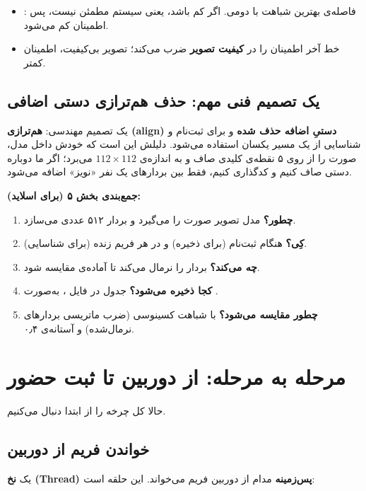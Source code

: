 \documentclass[12pt,a4paper]{article}
\begin{document}
\begin{itemize}[rightmargin=0pt]
  \item {}: فاصله‌ی بهترین شباهت با دومی. اگر کم باشد، یعنی سیستم مطمئن نیست، پس اطمینان کم می‌شود.
  \item خط آخر اطمینان را در \textbf{کیفیت تصویر} ضرب می‌کند؛ تصویر بی‌کیفیت، اطمینان کمتر.
\end{itemize}

\subsection{یک تصمیم فنی مهم: حذف هم‌ترازی دستی اضافی}
یک تصمیم مهندسی: \textbf{هم‌ترازی (align) دستیِ اضافه حذف شده} و برای ثبت‌نام و شناسایی از یک مسیر یکسان استفاده می‌شود. دلیلش این است که  خودش داخل مدل، صورت را از روی ۵ نقطه‌ی کلیدی صاف و به اندازه‌ی $112\times112$ می‌برد؛ اگر ما دوباره دستی صاف کنیم و کدگذاری کنیم، فقط بین بردارهای یک نفر «نویز» اضافه می‌شود.

\begin{note}
\textbf{جمع‌بندی بخش ۵ (برای اسلاید):}
\begin{enumerate}[rightmargin=0pt]
  \item \textbf{چطور؟} مدل  تصویر صورت را می‌گیرد و بردار ۵۱۲ عددی می‌سازد.
  \item \textbf{کِی؟} هنگام ثبت‌نام (برای ذخیره) و در هر فریم زنده (برای شناسایی).
  \item \textbf{چه می‌کند؟} بردار را نرمال می‌کند تا آماده‌ی مقایسه شود.
  \item \textbf{کجا ذخیره می‌شود؟} جدول  در فایل ، به‌صورت .
  \item \textbf{چطور مقایسه می‌شود؟} با شباهت کسینوسی (ضرب ماتریسی بردارهای نرمال‌شده) و آستانه‌ی ۰٫۴.
\end{enumerate}
\end{note}

\section{مرحله به مرحله: از دوربین تا ثبت حضور}
حالا کل چرخه را از ابتدا دنبال می‌کنیم.

\subsection{خواندن فریم از دوربین}
یک \textbf{نخ (Thread) پس‌زمینه} مدام از دوربین فریم می‌خواند. این حلقه  است:
\end{document}
